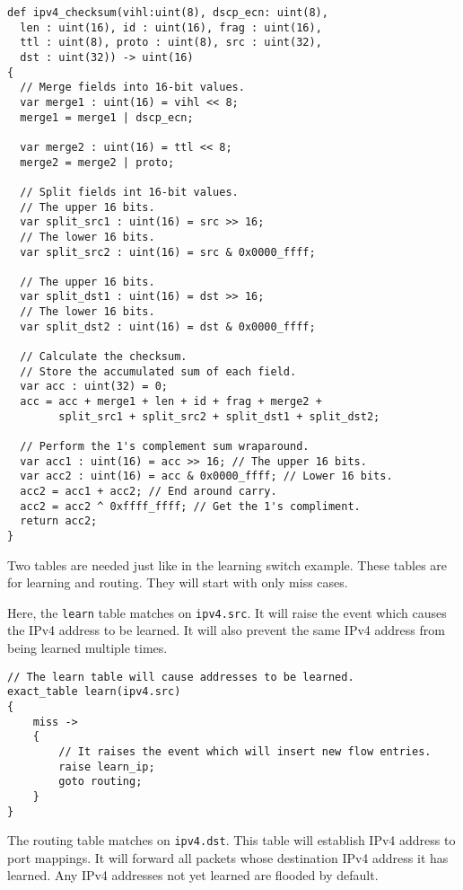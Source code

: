 \begin{codepage}
\begin{lstlisting}
def ipv4_checksum(vihl:uint(8), dscp_ecn: uint(8), 
  len : uint(16), id : uint(16), frag : uint(16), 
  ttl : uint(8), proto : uint(8), src : uint(32), 
  dst : uint(32)) -> uint(16)
{
  // Merge fields into 16-bit values.
  var merge1 : uint(16) = vihl << 8;
  merge1 = merge1 | dscp_ecn;

  var merge2 : uint(16) = ttl << 8;
  merge2 = merge2 | proto;

  // Split fields int 16-bit values.
  // The upper 16 bits.
  var split_src1 : uint(16) = src >> 16; 
  // The lower 16 bits.
  var split_src2 : uint(16) = src & 0x0000_ffff;

  // The upper 16 bits.
  var split_dst1 : uint(16) = dst >> 16;
  // The lower 16 bits.
  var split_dst2 : uint(16) = dst & 0x0000_ffff;

  // Calculate the checksum.
  // Store the accumulated sum of each field.
  var acc : uint(32) = 0;
  acc = acc + merge1 + len + id + frag + merge2 +
        split_src1 + split_src2 + split_dst1 + split_dst2;

  // Perform the 1's complement sum wraparound.
  var acc1 : uint(16) = acc >> 16; // The upper 16 bits.
  var acc2 : uint(16) = acc & 0x0000_ffff; // Lower 16 bits.
  acc2 = acc1 + acc2; // End around carry.
  acc2 = acc2 ^ 0xffff_ffff; // Get the 1's compliment.
  return acc2;
}
\end{lstlisting}
\end{codepage}


Two tables are needed just like in the learning switch example. These tables 
are for learning and routing. They will start with only miss cases. 

Here, the \texttt{learn} table matches on \texttt{ipv4.src}. It will raise the event which
causes the IPv4 address to be learned. It will also prevent the same IPv4 address
from being learned multiple times.

\begin{codepage}
\begin{lstlisting}
// The learn table will cause addresses to be learned.
exact_table learn(ipv4.src)
{
	miss ->
	{
		// It raises the event which will insert new flow entries.
		raise learn_ip;
		goto routing;
	}
}
\end{lstlisting}
\end{codepage}

The routing table matches on \texttt{ipv4.dst}. This table will establish IPv4
address to port mappings. It will forward all packets whose destination IPv4
address it has learned. Any IPv4 addresses not yet learned are flooded by
default.

